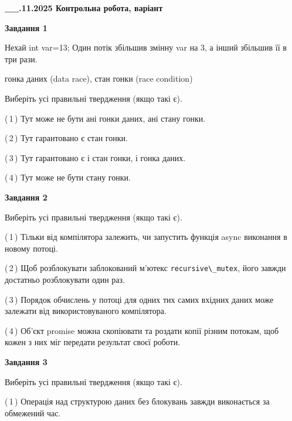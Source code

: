 \documentclass[12pt, ukrainian]{article}
\def\code#1{\Verb!#1!}
\begin{document}
\begin {large}

\textbf{\_\_.11.2025 Контрольна робота, варіант  }\par


{

\begin{center}
\textbf{Завдання 1}
\end{center}
Нехай int var=13; Один потік збільшив змінну var на 3, а інший збільшив її в три рази.

гонка даних (data race), стан гонки (race condition)

Виберіть усі правильні твердження (якщо такі є).\par
\vspace{2mm}
(\,1\,) Тут може не бути ані гонки даних, ані стану гонки.%

(\,2\,) Тут гарантовано є стан гонки.%

(\,3\,) Тут гарантовано є і стан гонки, і гонка даних.%

(\,4\,) Тут може не бути стану гонки.%



\begin{center}
\textbf{Завдання 2}
\end{center}
Виберіть усі правильні твердження (якщо такі є).\par
\vspace{2mm}

(\,1\,) Тільки від компілятора залежить, чи запустить функція async виконання в новому потоці.%

(\,2\,) Щоб розблокувати заблокований м’ютекс \code{recursive\_mutex}, його завжди достатньо розблокувати один раз.%

(\,3\,) Порядок обчислень у потоці для одних тих самих вхідних даних може залежати від використовуваного компілятора.%

(\,4\,) Об’єкт promise можна скопіювати та роздати копії різним потокам, щоб кожен з них міг передати результат своєї роботи.%



\begin{center}
\textbf{Завдання 3}
\end{center}
Виберіть усі правильні твердження (якщо такі є).\par
\vspace{2mm}

(\,1\,) Операція над структурою даних без блокувань завжди виконається за обмежений час.%

}
\end{large}
\end{document}
